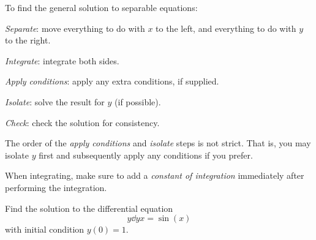 \documentclass{book}
\begin{document}
To find the general solution to separable equations:
\begin{enumerate*}
\item \emph{Separate}: move everything to do with $x$ to the left, and
  everything to do with $y$ to the right.
\item \emph{Integrate}: integrate both sides.
\item \emph{Apply conditions}: apply any extra conditions, if
  supplied.
\item \emph{Isolate}: solve the result for $y$ (if possible).
\item \emph{Check}: check the solution for consistency.
\end{enumerate*}

The order of the \emph{apply conditions} and \emph{isolate} steps is
not strict.  That is, you may isolate $y$ first and subsequently apply
any conditions if you prefer.

\begin{heads}
  When integrating, make sure to add a \emph{constant of integration}
  immediately after performing the integration.
\end{heads}

\newpage
\begin{easyexample}
  Find the solution to the differential equation
  \begin{equation}
    \label{eq:ex:separable}
    y \dd{y}{x} = \sin(x)
  \end{equation}
  with initial condition $y(0) = 1$.
\end{easyexample}
\end{document}

